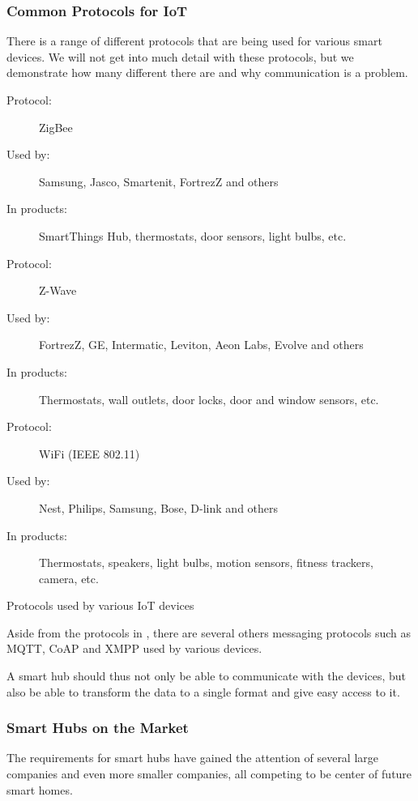 \subsubsection{Common Protocols for IoT}
There is a range of different protocols that are being used for various smart devices. 
We will not get into much detail with these protocols, 
but we demonstrate how many different there are and why communication is a problem.
\begin{table}
   \begin{description}
       \item[Protocol:] ZigBee
       \item[Used by:] Samsung, Jasco, Smartenit, FortrezZ and others
       \item[In products:] SmartThings Hub, thermostats, door sensors, light bulbs, etc.\\
       
       \item[Protocol:] Z-Wave
       \item[Used by:] FortrezZ, GE, Intermatic, Leviton, Aeon Labs, Evolve and others
       \item[In products:] Thermostats, wall outlets, door locks, door and window sensors, etc.  \\
       
       \item[Protocol:] WiFi (IEEE 802.11)
       \item[Used by:] Nest, Philips, Samsung, Bose, D-link and others
       \item[In products:] Thermostats, speakers, light bulbs, motion sensors, fitness trackers, camera, etc. 
    \end{description}
    \caption{Protocols used by various IoT devices}\label{table:iotprotocols}
\end{table}

Aside from the protocols in , 
there are several others messaging protocols such as MQTT, CoAP and XMPP used by various devices. 

A smart hub should thus not only be able to communicate with the devices, 
but also be able to transform the data to a single format and give easy access to it. 

\subsubsection{Smart Hubs on the Market}
The requirements for smart hubs have gained the attention of several large companies and even more smaller companies, 
all competing to be center of future smart homes. 

